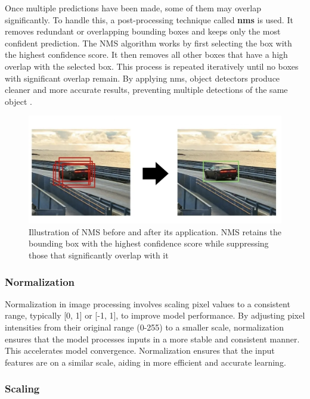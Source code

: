  Once multiple predictions have been made, some of them may overlap significantly. To handle this, a post-processing technique called \textbf{\gls{nms}} is used. It removes redundant or overlapping bounding boxes and keeps only the most confident prediction. The NMS algorithm works by first selecting the box with the highest confidence score. It then removes all other boxes that have a high overlap with the selected box. This process is repeated iteratively until no boxes with significant overlap remain. By applying \gls{nms}, object detectors produce cleaner and more accurate results, preventing multiple detections of the same object
\cite{thepythoncode:nms}.

\newpage

\begin{figure}[h!]
    \centering
    \includegraphics[width=0.75\linewidth]{figures/theory/image-recognition/nms.png}
    \caption[Non-maximum suppression (NMS) before and after applying the algorithm]{Illustration of NMS before and after its application. NMS retains the bounding box with the highest confidence score while suppressing those that significantly overlap with it \cite{thepythoncode:nms}}
    \label{fig:nms}
\end{figure}

\subsubsection*{Normalization}

Normalization in image processing involves scaling pixel values to a consistent range, typically [0, 1] or [-1, 1], to improve model performance. By adjusting pixel intensities from their original range (0-255) to a smaller scale, normalization ensures that the model processes inputs in a more stable and consistent manner. This accelerates model convergence. Normalization ensures that the input features are on a similar scale, aiding in more efficient and accurate learning.

\subsubsection*{Scaling}

